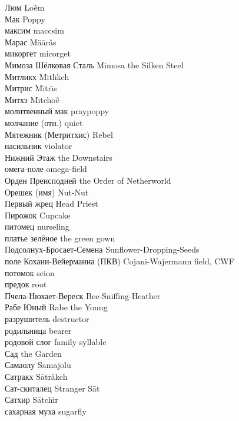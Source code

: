 Люм \hfill Lo\~{e}m\\
Мак \hfill Poppy\\
максим \hfill maccsim\\
Марас \hfill M\"{a}\={a}r\v{a}s\\
микоргет \hfill micorget\\
Мимоза Шёлковая Сталь \hfill Mimosa the Silken Steel\\
Митликх \hfill M\={\i}tl\={\i}kch\\
Митрис \hfill M\={\i}tr\={\i}s\\
Митхэ \hfill M\={\i}tcho\^{e}\\
молитвенный мак \hfill praypoppy\\
молчание (отн.) \hfill quiet\\
Мятежник (Метритхис) \hfill Rebel\\
насильник \hfill violator\\
Нижний Этаж \hfill the Downstairs\\
омега-поле \hfill omega-field\\
Орден Преисподней \hfill the Order of Netherworld\\
Орешек (имя) \hfill Nut-Nut\\
Первый жрец \hfill Head Priest\\
Пирожок \hfill Cupcake\\
питомец \hfill nurseling\\
платье зелёное \hfill the green gown\\
Подсолнух-Бросает-Семена \hfill Sunflower-Dropping-Seeds\\
поле Кохани-Вейерманна (ПКВ) \hfill Cojani-Wajermann field, CWF\\
потомок \hfill scion\\
предок \hfill root\\
Пчела-Нюхает-Вереск \hfill Bee-Sniffing-Heather\\
Рабе Юный \hfill Rabe the Young\\
разрушитель \hfill destructor\\
родильница \hfill bearer\\
родовой слог \hfill family syllable\\
Сад \hfill the Garden\\
Самаолу \hfill Samajolu\\
Сатракх \hfill S\={a}tr\`{a}kch\\
Сат-скиталец \hfill Stranger S\={a}t\\
Сатхир \hfill S\={a}tch\"{\i}r\\
сахарная муха \hfill sugarfly\\

